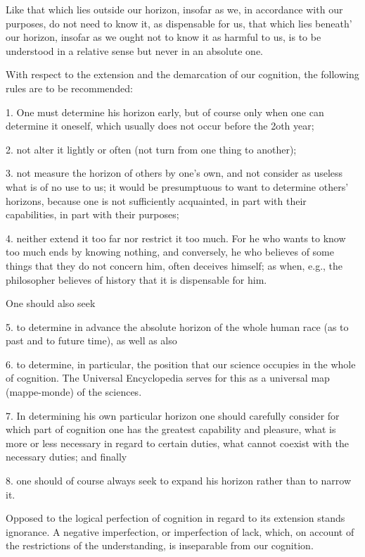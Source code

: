 Like that which lies outside our horizon, insofar as we, in accordance
with our purposes, do not need to know it, as dispensable for us, that which
lies beneath' our horizon, insofar as we ought not to know it as harmful to
us, is to be understood in a relative sense but never in an absolute one.

With respect to the extension and the demarcation of our cognition,
the following rules are to be recommended:

1. One must determine his horizon early,
but of course only when one can determine it oneself,
which usually does not occur before the 2oth year;

2. not alter it lightly or often
(not turn from one thing to another);

3. not measure the horizon of others by one's own,
and not consider as useless what is of no use to us;
it would be presumptuous to want to determine others' horizons,
because one is not sufficiently acquainted,
in part with their capabilities,
in part with their purposes;

4. neither extend it too far nor restrict it too much.
For he who wants to know too much ends by knowing nothing,
and conversely, he who believes of some things
that they do not concern him, often deceives himself;
as when, e.g., the philosopher believes of history
that it is dispensable for him.

One should also seek

5. to determine in advance the absolute horizon of
the whole human race (as to past and to future time),
as well as also

6. to determine, in particular, the position that
our science occupies in the whole of cognition.
The Universal Encyclopedia serves for this as
a universal map (mappe-monde) of the sciences.

7. In determining his own particular horizon
one should carefully consider for which part of cognition
one has the greatest capability and pleasure,
what is more or less necessary in regard to certain duties,
what cannot coexist with the necessary duties;
and finally

8. one should of course always seek
to expand his horizon rather than to narrow it.

Opposed to the logical perfection of cognition
in regard to its extension stands ignorance.
A negative imperfection, or imperfection of lack,
which, on account of the restrictions of the understanding,
is inseparable from our cognition.

